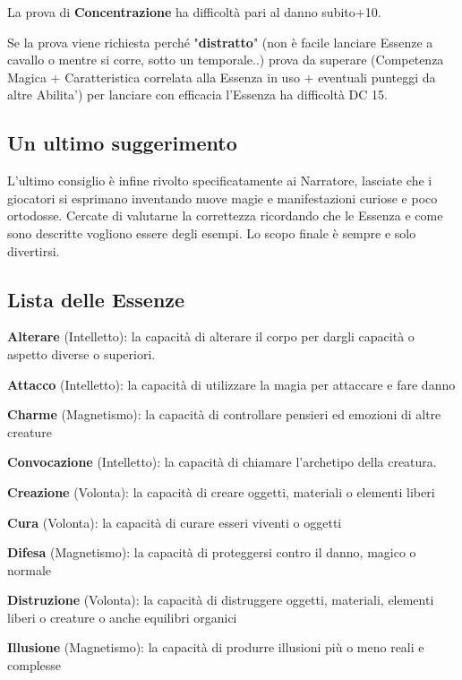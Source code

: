 \documentclass[a4paper,11pt,twoside,openany]{book}
\begin{document}
La prova di \textbf{Concentrazione} ha difficoltà pari al danno subito+10.

Se la prova viene richiesta perché "\textbf{distratto}" (non è facile lanciare Essenze a cavallo o mentre si corre, sotto un temporale..) prova da superare (Competenza Magica + Caratteristica correlata alla Essenza in uso + eventuali punteggi da altre Abilita') per lanciare con efficacia l'Essenza ha difficoltà DC 15.

\subsection{Un ultimo suggerimento}

L'ultimo consiglio è infine rivolto specificatamente ai Narratore, lasciate che i giocatori si esprimano inventando nuove magie e manifestazioni curiose e poco ortodosse. Cercate di valutarne la correttezza ricordando che le Essenza e come sono descritte vogliono essere degli esempi. Lo scopo finale è sempre e solo divertirsi.

\subsection{Lista delle Essenze}

\textbf{Alterare} (Intelletto): la capacità di alterare il corpo per dargli capacità o aspetto diverse o superiori.

\textbf{Attacco} (Intelletto): la capacità di utilizzare la magia per attaccare e fare danno

 \textbf{Charme} (Magnetismo): la capacità di controllare pensieri
ed emozioni di altre creature

\textbf{Convocazione} (Intelletto): la capacità di chiamare l'archetipo
della creatura.

\textbf{Creazione} (Volonta): la capacità di creare oggetti, materiali o elementi liberi

\textbf{Cura} (Volonta): la capacità di curare esseri viventi o oggetti

\textbf{Difesa} (Magnetismo): la capacità di proteggersi contro il danno, magico o normale

\textbf{Distruzione} (Volonta): la capacità di distruggere oggetti, materiali, elementi liberi o creature o anche equilibri organici

\textbf{Illusione} (Magnetismo): la capacità di produrre illusioni più o meno reali e complesse
\end{document}
